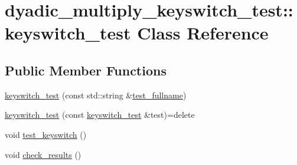 \hypertarget{classdyadic__multiply__keyswitch__test_1_1keyswitch__test}{\section{dyadic\-\_\-multiply\-\_\-keyswitch\-\_\-test\-:\-:keyswitch\-\_\-test Class Reference}
\label{classdyadic__multiply__keyswitch__test_1_1keyswitch__test}
}
\subsection*{Public Member Functions}
\begin{DoxyCompactItemize}
\item 
\hyperlink{classdyadic__multiply__keyswitch__test_1_1keyswitch__test_a8cfeba4a5a25c5131b8e7ca0daf03508}{keyswitch\-\_\-test} (const std\-::string \&\hyperlink{bench__keyswitch_8cpp_af98ed5ee0025fea2f25864641c3f5727}{test\-\_\-fullname})
\item 
\hyperlink{classdyadic__multiply__keyswitch__test_1_1keyswitch__test_a0cf1d5a356c6ea0de28236523bb19130}{keyswitch\-\_\-test} (const \hyperlink{classdyadic__multiply__keyswitch__test_1_1keyswitch__test}{keyswitch\-\_\-test} \&test)=delete
\item 
void \hyperlink{classdyadic__multiply__keyswitch__test_1_1keyswitch__test_a69155a01607c35e15359427c4c0c0a53}{test\-\_\-keyswitch} ()
\item 
void \hyperlink{classdyadic__multiply__keyswitch__test_1_1keyswitch__test_aa7100866e2c3b9ba3f4a80d4def713a2}{check\-\_\-results} ()
\end{DoxyCompactItemize}


